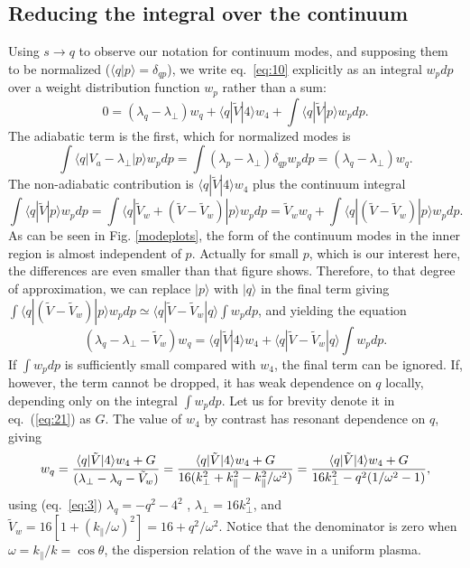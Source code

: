 \documentclass[12pt]{article}
\def\ket#1{|#1\rangle}
\def\bra#1{\langle#1}
\begin{document}
\subsection{Reducing the integral over the continuum}
\label{reducing}
Using $s\to q$ to observe our notation for continuum modes, and
supposing them to be normalized ($\bra{q}\ket{p}=\delta_{qp}$), we write eq.\
\ref{eq:10} explicitly as an integral $w_pdp$ over a
weight distribution function $w_p$ rather than a
sum:
\begin{equation}
  \label{continw}
  0=(\lambda_q-\lambda_\perp)w_q+\bra{q}|\tilde{V}\ket{4}w_4
  +\int\bra{q}|\tilde{V}\ket{p}w_pdp.
\end{equation}
The adiabatic term is the first, which for normalized modes is
\begin{equation}
  \label{eq:contadiab}
  \int\bra{q}|V_a-\lambda_\perp\ket{p}w_pdp = \int
  (\lambda_p-\lambda_\perp)\delta_{qp}w_pdp = (\lambda_q-\lambda_\perp)w_q.
\end{equation}
The non-adiabatic contribution is $\bra{q}|\tilde{V}\ket{4}w_4$ plus the
continuum integral
\begin{equation}
  \label{eq:18}
  \int \bra{q}|\tilde{V}\ket{p}w_pdp=\int\bra{q}|\tilde{V}_{w}+(\tilde{V}-\tilde{V}_{w})\ket{p}w_pdp
  =\tilde{V}_{w}w_q +\int\bra{q}|(\tilde{V}-\tilde{V}_{w})\ket{p}w_pdp.
\end{equation}
As can be seen in Fig. \ref{modeplots}, the form of the continuum
modes in the inner region is almost independent of $p$. Actually for
small $p$, which is our interest here, the differences are even
smaller than that figure shows. Therefore, to that degree of
approximation, we can replace $\ket{p}$ with $\ket{q}$ in the final
term giving $\int\bra{q}|(\tilde{V}-\tilde{V}_{w})\ket{p}w_pdp\simeq
\bra{q}|\tilde{V}-\tilde{V}_{w}\ket{q}\int w_pdp$, and yielding the
equation
\begin{equation}
  \label{eq:21}
  (\lambda_q-\lambda_\perp-\tilde V_w)w_q= \bra{q}|\tilde{V}\ket{4}w_4
  +\bra{q}|\tilde{V}-\tilde{V}_{w}\ket{q}\int w_pdp.
\end{equation}
If $\int w_pdp$ is sufficiently small compared with $w_4$, the final
term can be ignored.  If, however, the term cannot be dropped, it has
weak dependence on $q$ locally, depending only on the integral
$\int w_pdp$. Let us for brevity denote it in eq.\ (\ref{eq:21}) as
$G$. The value of $w_4$ by contrast has resonant dependence on $q$,
giving
\begin{equation}
  \label{eq:resonance}
  w_q = {\bra{q}|\tilde{V}\ket{4}w_4+G\over (\lambda_\perp-\lambda_q-\tilde{V}_{w})}
  ={\bra{q}|\tilde{V}\ket{4}w_4+G\over
    16(k_\perp^2+k_\parallel^2-k_\parallel^2/\omega^2) }
  ={\bra{q}|\tilde{V}\ket{4}w_4+G\over 16k_\perp^2-q^2(1/\omega^2-1) },
\end{equation}
using (eq.\ \ref{eq:3}) $\lambda_q=-q^2-4^2$ , $\lambda_\perp=16k_\perp^2$, and
$\tilde{V}_{w}=16[1+(k_\parallel/\omega)^2]=16+q^2/\omega^2$. Notice that the
denominator is zero when $\omega=k_\parallel/k=\cos\theta$, the
dispersion relation of the wave in a uniform plasma. 
\end{document}
